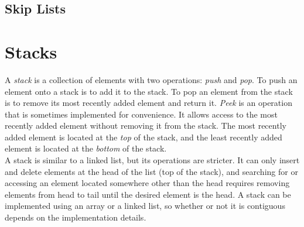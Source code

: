 \subsection{Skip Lists}

\section{Stacks}

A \textit{stack} is a collection of elements with two operations: \textit{push} and \textit{pop}. To push an element onto a stack is to add it to the stack. To pop an element from the stack is to remove its most recently added element and return it. \textit{Peek} is an operation that is sometimes implemented for convenience. It allows access to the most recently added element without removing it from the stack. The most recently added element is located at the \textit{top} of the stack, and the least recently added element is located at the \textit{bottom} of the stack. \\

A stack is similar to a linked list, but its operations are stricter. It can only insert and delete elements at the head of the list (top of the stack), and searching for or accessing an element located somewhere other than the head requires removing elements from head to tail until the desired element is the head. A stack can be implemented using an array or a linked list, so whether or not it is contiguous depends on the implementation details. \\\\

